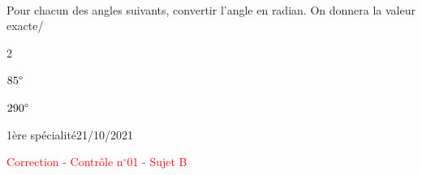 \documentclass[a4paper,12pt]{article}        %
\begin{document}
\\
Pour chacun des angles suivants, convertir l'angle en radian. On donnera la valeur exacte/
\begin{multicols}{2}
\begin{enumMet}
    \item $85\degree$ \quad {}
    \item $290\degree$ \quad {}
\end{enumMet}
\end{multicols}


\newpage
\vspace*{-1.5cm}
1ère spécialité\phantom{xxxxxxxxxxxxxxxxxxxxxxxxxxxxxxxxxxxxxxxxxxxxxxxxxxxxxxxxxxxxxxx}21/10/2021
{\begin{center}\Huge{\textcolor{red}{Correction - Contrôle n$^{\circ}$01 - Sujet B}}\end{center}}

\setcounter{exo}{1}
\end{document}
